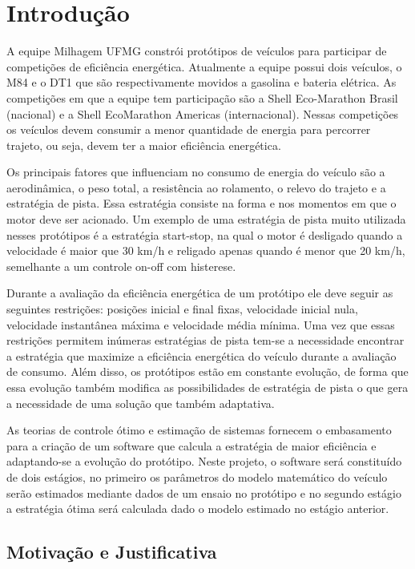 \chapter{Introdução}
\label{chap:intro} 
\thispagestyle{empty}

A equipe Milhagem UFMG constrói protótipos de veículos para participar de competições
de eficiência energética. Atualmente a equipe possui dois veículos, o M84 e o DT1 que
são respectivamente movidos a gasolina e bateria elétrica. As competições em que a
equipe tem participação são a Shell Eco-Marathon Brasil (nacional) e a Shell EcoMarathon Americas (internacional).
Nessas competições os veículos devem consumir a
menor quantidade de energia para percorrer trajeto, ou seja, devem ter a maior eficiência
energética.

Os principais fatores que influenciam no consumo de energia do veículo são a
aerodinâmica, o peso total, a resistência ao rolamento, o relevo do trajeto e a estratégia
de pista. Essa estratégia consiste na forma e nos momentos em que o motor deve ser
acionado. Um exemplo de uma estratégia de pista muito utilizada nesses protótipos é a
estratégia start-stop, na qual o motor é desligado quando a velocidade é maior que 30
km/h e religado apenas quando é menor que 20 km/h, semelhante a um controle on-off
com histerese.

Durante a avaliação da eficiência energética de um protótipo ele deve seguir as seguintes
restrições: posições inicial e final fixas, velocidade inicial nula, velocidade instantânea
máxima e velocidade média mínima. Uma vez que essas restrições permitem inúmeras
estratégias de pista tem-se a necessidade encontrar a estratégia que maximize a
eficiência energética do veículo durante a avaliação de consumo. Além disso, os protótipos
estão em constante evolução, de forma que essa evolução também modifica as
possibilidades de estratégia de pista o que gera a necessidade de uma solução que
também adaptativa.

As teorias de controle ótimo e estimação de sistemas fornecem o embasamento para a
criação de um software que calcula a estratégia de maior eficiência e adaptando-se a
evolução do protótipo. Neste projeto, o software será constituído de dois estágios, no
primeiro os parâmetros do modelo matemático do veículo serão estimados mediante
dados de um ensaio no protótipo e no segundo estágio a estratégia ótima será calculada
dado o modelo estimado no estágio anterior.

\section{Motivação e Justificativa}
\label{sec:motivacao}

